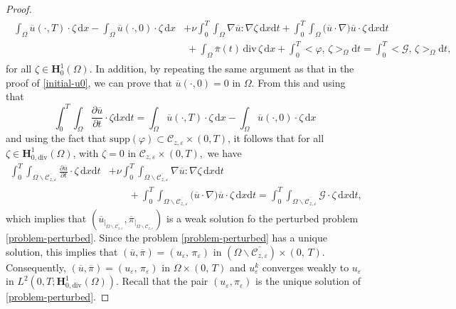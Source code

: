 \documentclass[a4paper,12pt,reqno,natbib]{amsart}
\newcommand{\dx} {\displaystyle\mathrm{d}x}
\newcommand{\dt} {\displaystyle\mathrm{d}t}
\def\H{\textbf{H}}
\def\div{\text{div}}
\begin{document}
\begin{proof}
\begin{align}
\begin{split}\label{problemhh}
    \int_\Omega\overline{u}(\cdot,T)\cdot \zeta \,\dx- \int_\Omega\overline{u}(\cdot,0)\cdot \zeta\,\dx&+\nu\int_0^T\int_\Omega\nabla \overline{u}:\nabla \zeta \,\dx\dt
    +\int_0^T\int_{\Omega}\big(\overline{u}\cdot\nabla\big) \overline{u}\cdot \zeta \,\dx\dt\\
    &\;+\int_\Omega \overline{\pi}(t)\,\text{div}\, \zeta\,\dx+   \int_0^T\big<\varphi,\,\zeta \big>_\Omega\dt=\int_0^T\big<\mathcal{G},\,\zeta \big>_\Omega\dt,
    \end{split}
\end{align}
for all $\zeta\in \H^1_0(\Omega)$. In addition, by repeating the same argument as that in the proof of \eqref{initial-u0}, we can prove that $\overline{u}(\cdot,0)=0$ in $\Omega.$ From this and using that 
$$
\int_0^T\int_\Omega\frac{\partial \overline{u}}{\partial t}\cdot\zeta\dx\dt= \int_\Omega\overline{u}(\cdot,T)\cdot \zeta \,\dx- \int_\Omega\overline{u}(\cdot,0)\cdot \zeta\,\dx
$$
and using the fact that $\text{supp}( \varphi)\subset\mathcal{C}_{z,\varepsilon} \times(0,T)$, it follows that for all $\zeta\in \H^1_{0,\div}(\Omega)$, with $\zeta=0$ in $\mathcal{C}_{z,\varepsilon}\times(0,T),$ we have
\begin{align*}
\int_0^T\int_{\Omega\backslash\overline{\mathcal{C}_{z,\varepsilon}}}\frac{\partial \overline{u}}{\partial t}\cdot\zeta \,\dx\dt&+\nu\int_0^T\int_{\Omega\backslash\overline{\mathcal{C}_{z,\varepsilon}}}\nabla \overline{u}:\nabla \zeta \,\dx\dt\\
&\qquad+\int_0^T\int_{\Omega\backslash\overline{\mathcal{C}_{z,\varepsilon}}}\big(\overline{u}\cdot\nabla\big) \overline{u}\cdot \zeta \,\dx\dt =\int_0^T\int_{\Omega\backslash\overline{\mathcal{C}_{z,\varepsilon}}}\mathcal{G}\cdot\zeta \,\dx\dt,
\end{align*}
which implies that $(\overline{u}_{|_{\Omega\backslash\overline{\mathcal{C}_{z,\varepsilon}}}},\overline{\pi}_{|_{\Omega\backslash\overline{\mathcal{C}_{z,\varepsilon}}}})$  is a weak solution fo the perturbed problem \eqref{problem-perturbed}.  Since the problem \eqref{problem-perturbed} has a unique solution, this implies that $(\overline{u},\overline{\pi})=(u_\varepsilon,\,\pi_\varepsilon)$ in $(\Omega\backslash\overline{\mathcal{C}_{z,\varepsilon}})\times(0,\,T)$. Consequently, $(\overline{u},\overline{\pi})=(u_\varepsilon,\,\pi_\varepsilon)$ in $\Omega\times(0,\,T)$ and $u_\varepsilon^k$ converges weakly to $u_\varepsilon$ in  $L^2(0,T;\H^1_{0,\div}(\Omega))$. Recall that the pair \( (u_\varepsilon, \pi_\varepsilon) \) is the unique solution of \eqref{problem-perturbed}.
\end{proof}
\end{document}
